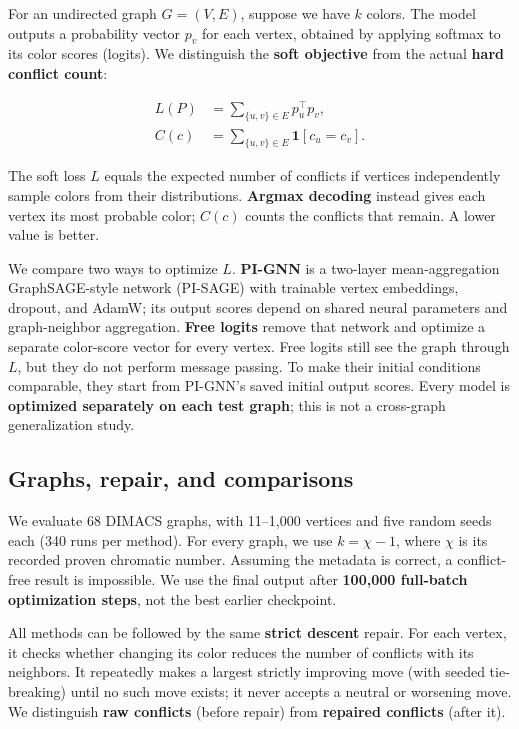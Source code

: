 \documentclass[11pt,letterpaper,twocolumn]{article}
\begin{document}
For an undirected graph \(G=(V,E)\), suppose we have \(k\) colors. The model outputs a probability vector \(p_v\) for each vertex, obtained by applying softmax to its color scores (logits). We distinguish the \textbf{soft objective} from the actual \textbf{hard conflict count}:

\[
\begin{aligned}
L(P)&=\sum_{\{u,v\}\in E}p_u^\top p_v,\\
C(c)&=\sum_{\{u,v\}\in E}\mathbf{1}[c_u=c_v].
\end{aligned}
\]

The soft loss \(L\) equals the expected number of conflicts if vertices independently sample colors from their distributions. \textbf{Argmax decoding} instead gives each vertex its most probable color; \(C(c)\) counts the conflicts that remain. A lower value is better.

We compare two ways to optimize \(L\). \textbf{PI-GNN} is a two-layer mean-aggregation GraphSAGE-style network (PI-SAGE) with trainable vertex embeddings, dropout, and AdamW; its output scores depend on shared neural parameters and graph-neighbor aggregation. \textbf{Free logits} remove that network and optimize a separate color-score vector for every vertex. Free logits still see the graph through \(L\), but they do not perform message passing. To make their initial conditions comparable, they start from PI-GNN's saved initial output scores. Every model is \textbf{optimized separately on each test graph}; this is not a cross-graph generalization study.

\subsection{Graphs, repair, and comparisons}\label{graphs-repair-and-comparisons}

We evaluate 68 DIMACS graphs, with 11--1,000 vertices and five random seeds each (340 runs per method). For every graph, we use \(k=\chi-1\), where \(\chi\) is its recorded proven chromatic number. Assuming the metadata is correct, a conflict-free result is impossible. We use the final output after \textbf{100,000 full-batch optimization steps}, not the best earlier checkpoint.

All methods can be followed by the same \textbf{strict descent} repair. For each vertex, it checks whether changing its color reduces the number of conflicts with its neighbors. It repeatedly makes a largest strictly improving move (with seeded tie-breaking) until no such move exists; it never accepts a neutral or worsening move. We distinguish \textbf{raw conflicts} (before repair) from \textbf{repaired conflicts} (after it).
\end{document}
